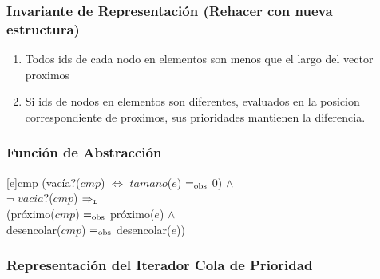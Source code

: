 	\subsubsection{Invariante de Representación (Rehacer con nueva estructura)}

		\renewcommand{\labelenumi}{(\Roman{enumi})}

		\begin{enumerate}
			\item Todos ids de cada nodo en elementos son menos que el largo del vector proximos 
			\item Si ids de nodos en elementos son diferentes, evaluados en la posicion correspondiente de proximos, sus prioridades mantienen la diferencia.  
		\end{enumerate}


	\mbox{}

	\subsubsection{Función de Abstracción}


		[e]{cmp}{
			(vacía?($cmp$) $\Leftrightarrow$ $tamano$($e$) $=_{\mathrm{obs}}$ 0) $\land$ \\
			 $\neg$ $vacia?$($cmp$) $\Rightarrow_{\mathrm{\scriptscriptstyle{L}}}$ \\
		  	 (próximo($cmp$) $=_{\mathrm{obs}}$ próximo($e$) $\land$ \\
			 desencolar($cmp$) $=_{\mathrm{obs}}$ desencolar($e$))}

\subsubsection{Representación del Iterador Cola de Prioridad}

